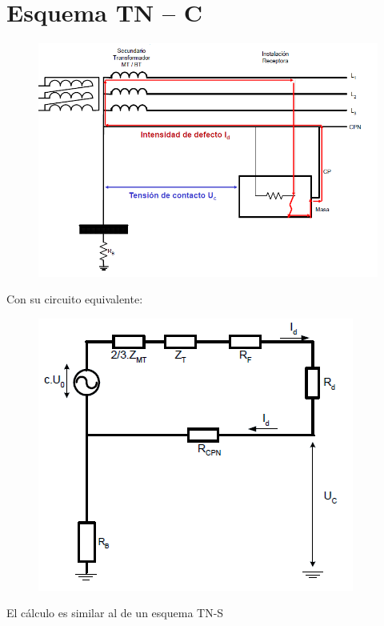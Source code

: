 \section{Esquema TN – C}
\begin{figure}[H]
	\centering
	\includegraphics[width=0.7\linewidth]{Images/31}
	\label{fig:31}
\end{figure}

Con su circuito equivalente:
\begin{figure}[H]
	\centering
	\includegraphics[width=0.7\linewidth]{Images/32}
	\label{fig:32}
\end{figure}

El cálculo es similar al de un esquema TN-S
